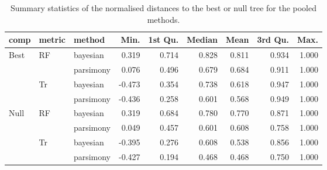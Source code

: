 \begin{table}[ht]
\centering
\begin{tabular}{lllrrrrrr}
  \hline
comp & metric & method & Min. & 1st Qu. & Median & Mean & 3rd Qu. & Max. \\ 
  \hline
Best & RF & bayesian & 0.319 & 0.714 & 0.828 & 0.811 & 0.934 & 1.000 \\ 
   &  & parsimony & 0.076 & 0.496 & 0.679 & 0.684 & 0.911 & 1.000 \\ 
   & Tr & bayesian & -0.473 & 0.354 & 0.738 & 0.618 & 0.947 & 1.000 \\ 
   &  & parsimony & -0.436 & 0.258 & 0.601 & 0.568 & 0.949 & 1.000 \\ 
  Null & RF & bayesian & 0.319 & 0.684 & 0.780 & 0.770 & 0.871 & 1.000 \\ 
   &  & parsimony & 0.049 & 0.457 & 0.601 & 0.608 & 0.758 & 1.000 \\ 
   & Tr & bayesian & -0.395 & 0.276 & 0.608 & 0.538 & 0.856 & 1.000 \\ 
   &  & parsimony & -0.427 & 0.194 & 0.468 & 0.468 & 0.750 & 1.000 \\ 
   \hline
\end{tabular}
\caption{Summary statistics of the normalised distances to the best or null tree for the pooled methods.} 
\label{Full_Tab_pooledmethod}
\end{table}
